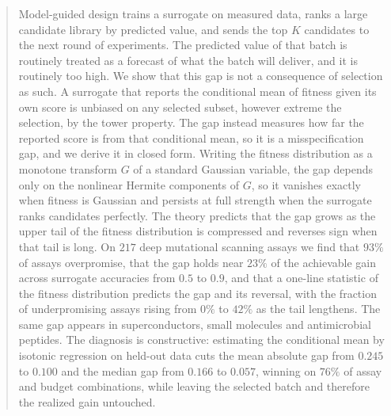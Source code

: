 \documentclass{article}
\theoremstyle{plain}
\theoremstyle{definition}
\begin{document}

\printAffiliationsAndNotice{}

\begin{abstract}
Model-guided design trains a surrogate on measured data, ranks a large candidate
library by predicted value, and sends the top $K$ candidates to the next round of
experiments. The predicted value of that batch is routinely treated as a forecast of
what the batch will deliver, and it is routinely too high. We show that this gap is
not a consequence of selection as such. A surrogate that reports the conditional mean
of fitness given its own score is unbiased on any selected subset, however extreme the
selection, by the tower property. The gap instead measures how far the reported score
is from that conditional mean, so it is a misspecification gap, and we derive it in
closed form. Writing the fitness distribution as a monotone transform $G$ of a standard
Gaussian variable, the gap depends only on the nonlinear Hermite components of $G$, so
it vanishes exactly when fitness is Gaussian and persists at full strength when the
surrogate ranks candidates perfectly. The theory predicts that the gap grows as the
upper tail of the fitness distribution is compressed and reverses sign when that tail
is long. On $217$ deep mutational scanning assays we find that $93\%$ of assays
overpromise, that the gap holds near $23\%$ of the achievable gain across surrogate
accuracies from $0.5$ to $0.9$, and that a one-line statistic of the fitness
distribution predicts the gap and its reversal, with the fraction of underpromising
assays rising from $0\%$ to $42\%$ as the tail lengthens. The same gap appears in
superconductors, small molecules and antimicrobial peptides. The diagnosis is
constructive: estimating the conditional mean by isotonic regression on held-out data
cuts the mean absolute gap from $0.245$ to $0.100$ and the median gap from $0.166$ to
$0.057$, winning on $76\%$ of assay and budget combinations, while leaving the selected
batch and therefore the realized gain untouched.
\end{abstract}
\end{document}
